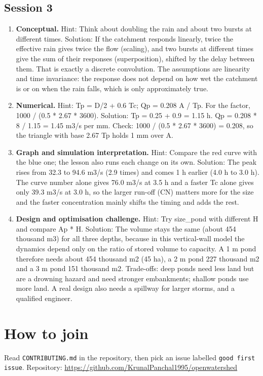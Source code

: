 \documentclass[11pt,a4paper]{article}
\begin{document}
\subsection*{Session 3}
\begin{enumerate}[nosep]
\item \textbf{Conceptual.} Hint: Think about doubling the rain and about two bursts at different times. Solution: If the catchment responds linearly, twice the effective rain gives twice the flow (scaling), and two bursts at different times give the sum of their responses (superposition), shifted by the delay between them. That is exactly a discrete convolution. The assumptions are linearity and time invariance: the response does not depend on how wet the catchment is or on when the rain falls, which is only approximately true.
\item \textbf{Numerical.} Hint: Tp = D/2 + 0.6 Tc; Qp = 0.208 A / Tp. For the factor, 1000 / (0.5 * 2.67 * 3600). Solution: Tp = 0.25 + 0.9 = 1.15 h. Qp = 0.208 * 8 / 1.15 = 1.45 m3/s per mm. Check: 1000 / (0.5 * 2.67 * 3600) = 0.208, so the triangle with base 2.67 Tp holds 1 mm over A.
\item \textbf{Graph and simulation interpretation.} Hint: Compare the red curve with the blue one; the lesson also runs each change on its own. Solution: The peak rises from 32.3 to 94.6 m3/s (2.9 times) and comes 1 h earlier (4.0 h to 3.0 h). The curve number alone gives 76.0 m3/s at 3.5 h and a faster Tc alone gives only 39.3 m3/s at 3.0 h, so the larger run-off (CN) matters more for the size and the faster concentration mainly shifts the timing and adds the rest.
\item \textbf{Design and optimisation challenge.} Hint: Try size\_pond with different H and compare Ap * H. Solution: The volume stays the same (about 454 thousand m3) for all three depths, because in this vertical-wall model the dynamics depend only on the ratio of stored volume to capacity. A 1 m pond therefore needs about 454 thousand m2 (45 ha), a 2 m pond 227 thousand m2 and a 3 m pond 151 thousand m2. Trade-offs: deep ponds need less land but are a drowning hazard and need stronger embankments; shallow ponds use more land. A real design also needs a spillway for larger storms, and a qualified engineer.
\end{enumerate}

\section{How to join}
Read \texttt{CONTRIBUTING.md} in the repository, then pick an issue labelled \texttt{good first issue}. Repository: \url{https://github.com/KrunalPanchal1995/openwatershed}
\end{document}
